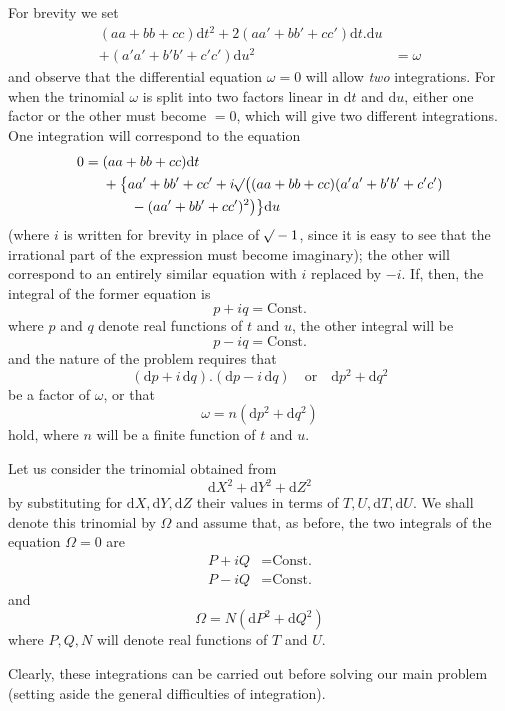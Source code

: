 For brevity we set
\[
\begin{aligned}
(aa+bb+cc)\mathrm{d}t^2+2(aa'+bb'+cc')\mathrm{d}t\mathord{.}\mathrm{d}u&\\
+(a'a'+b'b'+c'c')\mathrm{d}u^2&=\omega
\end{aligned}
\]
\noindent and observe that the differential equation \(\omega=0\) will allow \textit{two} integrations. For when the trinomial \(\omega\) is split into two factors linear in
\(\mathrm{d}t\) and \(\mathrm{d}u\), either one factor or the other must become \(=0\), which will give two different integrations. One integration will correspond to the equation
\[
\begin{aligned}
0={}&(aa+bb+cc)\mathrm{d}t\\
&+\bigl\{aa'+bb'+cc'+i\mathord{{}^{}\!\surd}\bigl((aa+bb+cc)(a'a'+b'b'+c'c')\\
&\qquad-(aa'+bb'+cc')^2\bigr)\bigr\}\mathrm{d}u
\end{aligned}
\]
\noindent (where \(i\) is written for brevity in place of \(\mathord{{}^{}\!\surd}-1\), since it is easy to see that the irrational part of the expression must become imaginary); the other will correspond to an entirely similar equation with \(i\) replaced by \(-i\). If, then, the integral of the former equation is
\[
p+iq=\text{Const.}
\]
\noindent where \(p\) and \(q\) denote real functions of \(t\) and \(u\), the other integral will be
\[
p-iq=\text{Const.}
\]
\noindent and the nature of the problem requires that
\[
(\mathrm{d}p+i\,\mathrm{d}q)\mathord{.}(\mathrm{d}p-i\,\mathrm{d}q)\quad\text{or}\quad\mathrm{d}p^2+\mathrm{d}q^2
\]
\noindent be a factor of \(\omega\), or that
\[
\omega=n(\mathrm{d}p^2+\mathrm{d}q^2)
\]
\noindent hold, where \(n\) will be a finite function of \(t\) and \(u\).

Let us consider the trinomial obtained from
\[
\mathrm{d}X^2+\mathrm{d}Y^2+\mathrm{d}Z^2
\]
\noindent by substituting for \(\mathrm{d}X,\mathrm{d}Y,\mathrm{d}Z\) their values in terms of \(T,U,\mathrm{d}T,\mathrm{d}U\). We shall denote this trinomial by \(\Omega\) and assume that, as before, the two integrals of the equation \(\Omega=0\) are
\[
\begin{aligned}
P+iQ&=\text{Const.}\\
P-iQ&=\text{Const.}
\end{aligned}
\]
\noindent and
\[
\Omega=N(\mathrm{d}P^2+\mathrm{d}Q^2)
\]
\noindent where \(P,Q,N\) will denote real functions of \(T\) and \(U\).
\par\indent{}%
Clearly, these integrations can be carried out before solving our main problem (setting aside the general difficulties of integration).

